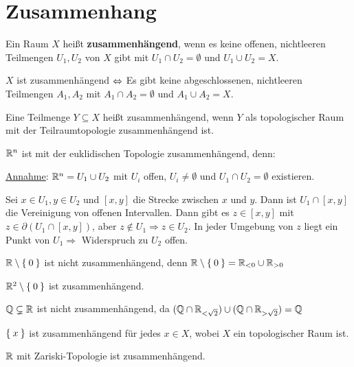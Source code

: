 \section{Zusammenhang}
\begin{definition}%
    Ein Raum $X$ heißt \textbf{zusammenhängend}, wenn es keine offenen,
    nichtleeren Teilmengen $U_1, U_2$ von $X$ gibt mit 
    $U_1 \cap U_2 = \emptyset$ und $U_1 \cup U_2 = X$.
\end{definition}

\begin{bemerkung}
    $X$ ist zusammenhängend $\Leftrightarrow$ Es gibt keine abgeschlossenen,
    nichtleeren Teilmengen $A_1, A_2$ mit $A_1 \cap A_2 = \emptyset$ 
    und $A_1 \cup A_2 = X$.
\end{bemerkung}

\begin{bemerkung}
    Eine Teilmenge $Y \subseteq X$ heißt zusammenhängend, wenn $Y$
    als topologischer Raum mit der Teilraumtopologie zusammenhängend ist.
\end{bemerkung}

%

\begin{beispiel}
    \begin{bspenum}
        \item $\mathbb{R}^n$ ist mit der euklidischen Topologie zusammenhängend,
            denn:

            \underline{Annahme}: $\mathbb{R}^n = U_1 \cup U_2$ mit $U_i$ 
            offen, $U_i \neq \emptyset$ und $U_1 \cap U_2 = \emptyset$ 
            existieren.

            Sei $x \in U_1, y \in U_2$ und $[x,y]$ die Strecke zwischen $x$
            und $y$. Dann ist $U_1 \cap [x,y]$ die Vereinigung von offenen
            Intervallen. Dann gibt es $z \in [x,y]$ mit $z \in \partial (U_1 \cap [x,y])$,
            aber $z \notin U_1 \Rightarrow z \in U_2$. In jeder Umgebung von 
            $z$ liegt ein Punkt von $U_1 \Rightarrow$ Widerspruch zu $U_2$ offen.
        \item $\mathbb{R} \setminus \Set{0}$ ist nicht zusammenhängend, denn
              $\mathbb{R} \setminus \Set{0} = \mathbb{R}_{< 0} \cup \mathbb{R}_{> 0}$
        \item $\mathbb{R}^2 \setminus \Set{0}$ ist zusammenhängend.
        \item $\mathbb{Q} \subsetneq \mathbb{R}$ ist nicht zusammenhängend, da 
              $(\mathbb{Q} \cap \mathbb{R}_{< \sqrt{2}}) \cup (\mathbb{Q} \cap \mathbb{R}_{> \sqrt{2}}) = \mathbb{Q}$
        \item $\Set{x}$ ist zusammenhängend für jedes $x \in X$, 
              wobei $X$ ein topologischer Raum ist.
        \item $\mathbb{R}$ mit Zariski-Topologie ist zusammenhängend.
    \end{bspenum}
\end{beispiel}


